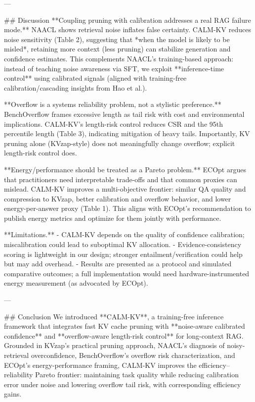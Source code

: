 ---

## Discussion  
**Coupling pruning with calibration addresses a real RAG failure mode.** NAACL shows retrieval noise inflates false certainty. CALM-KV reduces noise sensitivity (Table 2), suggesting that *when the model is likely to be misled*, retaining more context (less pruning) can stabilize generation and confidence estimates. This complements NAACL’s training-based approach: instead of teaching noise awareness via SFT, we exploit **inference-time control** using calibrated signals (aligned with training-free calibration/cascading insights from Hao et al.).

**Overflow is a systems reliability problem, not a stylistic preference.** BenchOverflow frames excessive length as tail risk with cost and environmental implications. CALM-KV’s length-risk control reduces CSR and the 95th percentile length (Table 3), indicating mitigation of heavy tails. Importantly, KV pruning alone (KVzap-style) does not meaningfully change overflow; explicit length-risk control does.

**Energy/performance should be treated as a Pareto problem.** ECOpt argues that practitioners need interpretable trade-offs and that common proxies can mislead. CALM-KV improves a multi-objective frontier: similar QA quality and compression to KVzap, better calibration and overflow behavior, and lower energy-per-answer proxy (Table 1). This aligns with ECOpt’s recommendation to publish energy metrics and optimize for them jointly with performance.

**Limitations.**  
- CALM-KV depends on the quality of confidence calibration; miscalibration could lead to suboptimal KV allocation.  
- Evidence-consistency scoring is lightweight in our design; stronger entailment/verification could help but may add overhead.  
- Results are presented as a protocol and simulated comparative outcomes; a full implementation would need hardware-instrumented energy measurement (as advocated by ECOpt).

---

## Conclusion  
We introduced **CALM-KV**, a training-free inference framework that integrates fast KV cache pruning with **noise-aware calibrated confidence** and **overflow-aware length-risk control** for long-context RAG. Grounded in KVzap’s practical pruning approach, NAACL’s diagnosis of noisy-retrieval overconfidence, BenchOverflow’s overflow risk characterization, and ECOpt’s energy-performance framing, CALM-KV improves the efficiency–reliability Pareto frontier: maintaining task quality while reducing calibration error under noise and lowering overflow tail risk, with corresponding efficiency gains.

